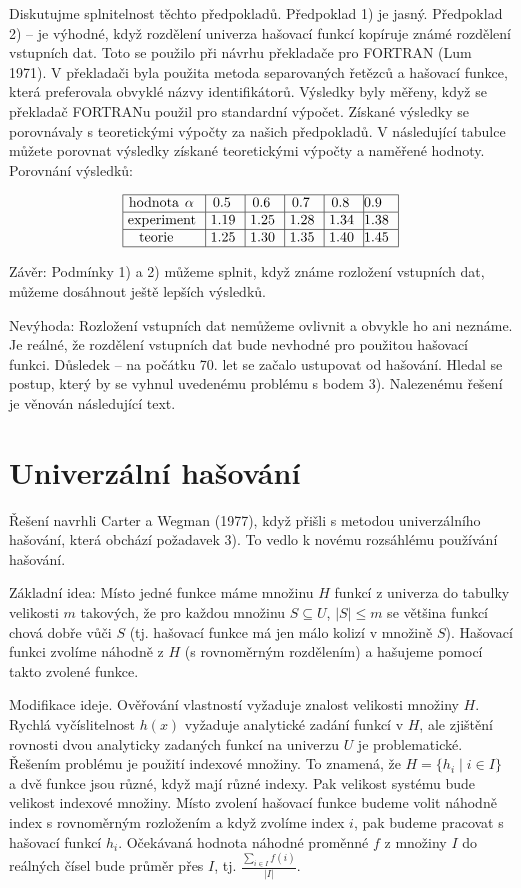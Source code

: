 \documentclass[a4paper,12pt]{article}
\begin{document}
Diskutujme splnitelnost těchto předpokladů.\newline 
Předpoklad 1) je jasný.\newline 
Předpoklad 2) -- je výhodné, 
když rozdělení univerza hašovací funkcí kopíruje známé 
rozděle\-ní vstupních dat. Toto se použilo při návrhu 
překladače pro FORTRAN (Lum 1971). V překladači byla použita metoda separovaných řetězců a hašovací funkce, 
která preferovala obvyklé názvy identifikátorů. Výsledky byly měřeny, když se překladač FORTRANu použil pro standardní výpočet. Získané výsledky se porovnávaly s teoretickými výpočty za našich předpokladů. V 
následující tabulce můžete porovnat výsledky 
získané teoretickými výpočty a naměřené hodnoty.
Porovnání výsledků:

$$\vtop{\offinterlineskip\halign {\strut\vrule\ # & \vrule\ # & \vrule\ # & \vrule\ # & \vrule\ # & \vrule \hfil # \hfil \vrule\cr\noalign{\hrule}hodnota $\alpha$ & 0.5 & 0.6 & 0.7 & 0.8 & 0.9 \hfill \cr\noalign{\hrule}experiment & 1.19 & 1.25 & 1.28 & 1.34 & 1.38 \cr\noalign{\hrule}teorie & 1.25 & 1.30 & 1.35 & 1.40 & 1.45 \cr\noalign{\hrule}}}$$

Závěr: Podmínky 1) a 2) můžeme splnit, 
když známe rozložení vstupních dat, můžeme 
dosáhnout ještě lepších výsledků.

Nevýhoda: Rozložení vstupních dat 
nemůžeme ovlivnit a obvykle ho ani neznáme. Je 
reálné, že rozdělení vstupních dat bude nevhodné pro 
použitou hašovací funkci. Důsledek -- na počátku 
70. let se začalo ustupovat od hašování. Hledal se postup, 
který by se vyhnul uvedenému problému s bodem 3). Nalezenému 
řešení je věnován následující text.

\section{Univerzální hašování}

Řešení navrhli Carter a Wegman (1977), když přišli s 
metodou univerzálního hašování, která obchází poža\-davek 3).  
To vedlo k novému rozsáhlému používání hašování.  

Základní idea: Místo jedné funkce máme 
množinu $H$ funkcí z univerza do tabulky velikosti $m$ 
takových, že pro každou množinu $S\subseteq U$, $|S|\le 
m$ se 
většina funkcí chová dobře vůči $S$ (tj. hašovací funkce má jen málo kolizí v množině $S$). 
Hašovací funkci 
zvolíme náhodně z $H$ (s rovnoměrným rozdělením) a hašujeme  
pomocí takto zvo\-lené funkce. 

Modifikace ideje. Ověřování vlastností vyžaduje 
znalost velikosti množiny $H$. Rychlá vyčíslitelnost $
h(x)$ 
vyžaduje ana\-lytické zadání funkcí v $H$, ale zjištění rovnosti 
dvou analy\-ticky zadaných funkcí na univerzu $U$ je 
problematické. Řešením problému je použití indexové množiny. 
To znamená, že $H=\{h_i\mid i\in I\}$ a dvě funkce jsou různé, 
když mají různé indexy. Pak velikost systému bude 
velikost indexové množiny. Místo zvolení hašovací funkce 
budeme volit náhodně index s rovnoměrným rozložením a když 
zvolíme index $i$, pak budeme pracovat s hašovací funkcí $
h_i$. 
Očekávaná hodnota náhodné proměnné $f$ z množiny $
I$ do 
reálných čísel bude průměr přes $I$, tj. $\frac {
\sum_{i\in I}f(i)}{|I|}$.
\end{document}
